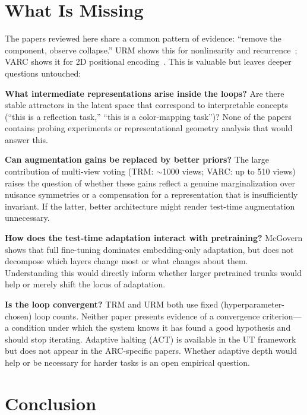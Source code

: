 \documentclass[11pt, letterpaper]{article}
\begin{document}
\section{What Is Missing}
\label{sec:missing}

The papers reviewed here share a common pattern of evidence: ``remove the
component, observe collapse.'' URM shows this for nonlinearity and
recurrence~\cite{gao2025urm}; VARC shows it for 2D positional
encoding~\cite{hu2025varc}. This is valuable but leaves deeper questions
untouched:

\textbf{What intermediate representations arise inside the loops?} Are there
stable attractors in the latent space that correspond to interpretable
concepts (``this is a reflection task,'' ``this is a color-mapping task'')?
None of the papers contains probing experiments or representational geometry
analysis that would answer this.

\textbf{Can augmentation gains be replaced by better priors?} The large
contribution of multi-view voting (TRM: $\sim$1000 views; VARC: up to 510
views) raises the question of whether these gains reflect a genuine
marginalization over nuisance symmetries or a compensation for a
representation that is insufficiently invariant. If the latter, better
architecture might render test-time augmentation unnecessary.

\textbf{How does the test-time adaptation interact with pretraining?} McGovern
shows that full fine-tuning dominates embedding-only adaptation, but does not
decompose which layers change most or what changes about them. Understanding
this would directly inform whether larger pretrained trunks would help or
merely shift the locus of adaptation.

\textbf{Is the loop convergent?} TRM and URM both use fixed (hyperparameter-
chosen) loop counts. Neither paper presents evidence of a convergence
criterion---a condition under which the system knows it has found a good
hypothesis and should stop iterating. Adaptive halting (ACT) is available in
the UT framework but does not appear in the ARC-specific papers. Whether
adaptive depth would help or be necessary for harder tasks is an open
empirical question.

\section{Conclusion}
\label{sec:conclusion}
\end{document}

